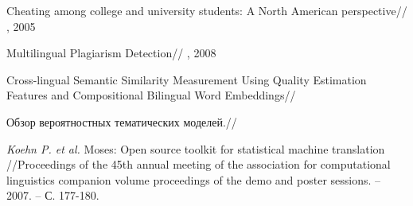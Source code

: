 \documentclass[12pt, twoside]{article}
\begin{document}
\begin{thebibliography}{4}

    Cheating among college and university students: A North American perspective//
    , 2005
    
    Multilingual Plagiarism Detection//
    , 2008
    
    Cross-lingual Semantic Similarity Measurement Using Quality Estimation Features and Compositional Bilingual Word Embeddings//
    
    Обзор вероятностных тематических моделей.//
  
  \textit{Koehn P. et al.} Moses: Open source toolkit for statistical machine translation //Proceedings of the 45th annual meeting of the association for computational linguistics companion volume proceedings of the demo and poster sessions. – 2007. – С. 177-180.

	  
\end{thebibliography}
\end{document}
